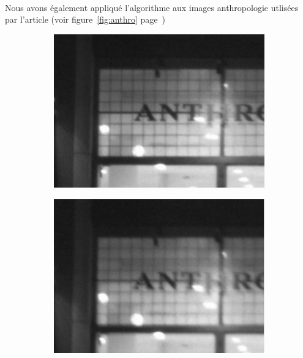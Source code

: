 \documentclass[a4paper,10pt]{report}
\begin{document}
\paragraph{}
Nous avons également appliqué l'algorithme aux images anthropologie utlisées par l'article (voir figure~\ref{fig:anthro}
page~\pageref{fig:anthro})


\begin{figure}[h]
 
  \begin{subfigure}{0.32\textwidth}
    \includegraphics[width=0.9\linewidth]{ressource/detail_anthro1.png} 
    \label{fig:anthro1}
  \end{subfigure}
  \begin{subfigure}{0.32\textwidth}
    \includegraphics[width=0.9\linewidth]{ressource/detail_anthro3.png} 
    \label{fig:anthro3}
  \end{subfigure}
  \begin{subfigure}{0.32\textwidth}

\end{subfigure}
\end{figure}
\end{document}
